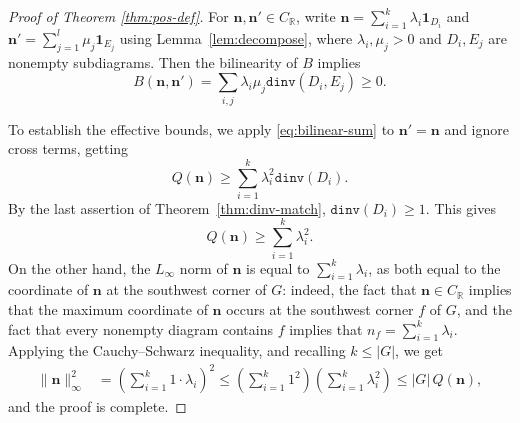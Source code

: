 \documentclass[11pt,reqno]{amsart}
\theoremstyle{remark}
\begin{document}
\begin{proof}[Proof of Theorem \ref{thm:pos-def}]
For $\mathbf{n},\mathbf{n'}\in C_\mathbb{R}$, write $\mathbf{n}=\sum_{i=1}^k \lambda_i \mathbf{1}_{D_i}$ and $\mathbf{n'}=\sum_{j=1}^l \mu_j \mathbf{1}_{E_j}$ using Lemma~\ref{lem:decompose}, where $\lambda_i,\mu_j>0$ and $D_i, E_j$ are nonempty subdiagrams. Then the bilinearity of $B$ implies
\begin{equation}\label{eq:bilinear-sum}
    B(\mathbf{n},\mathbf{n'})=\sum_{i,j} \lambda_i\mu_j \mathtt{dinv}(D_i, E_j)\geq 0.
\end{equation}


To establish the effective bounds, we apply \eqref{eq:bilinear-sum} to $\mathbf{n'}=\mathbf{n}$ and ignore cross terms, getting
\[ Q(\mathbf{n})\geq \sum_{i=1}^k \lambda_i^2 \mathtt{dinv}(D_i).\]
By the last assertion of Theorem~\ref{thm:dinv-match}, $\mathtt{dinv}(D_i)\geq 1$. This gives
\[ Q(\mathbf{n}) \geq \sum_{i=1}^k \lambda_i^2.\]
On the other hand, the $L_\infty$ norm of $\mathbf{n}$ is equal to $\sum_{i=1}^k  \lambda_i$, as both equal to the coordinate of $\mathbf{n}$ at the southwest corner of $G$: indeed, the fact that $\mathbf{n}\in C_\mathbb{R}$ implies that the maximum coordinate of $\mathbf{n}$ occurs at the southwest corner $f$ of $G$, and the fact that every nonempty diagram contains $f$ implies that $n_f=\sum_{i=1}^k \lambda_i$. Applying the Cauchy--Schwarz inequality, and recalling $k\leq |G|$, we get
\begin{align*}
    \|\mathbf{n}\|_\infty^2 &= \left(\sum_{i=1}^k  1\cdot \lambda_i\right)^2 
    \leq \left(\sum_{i=1}^k 1^2\right) \left(\sum_{i=1}^k \lambda_i^2\right)  
    \leq  |G|\, Q(\mathbf{n}),
\end{align*}
and the proof is complete.
\end{proof}
\end{document}
